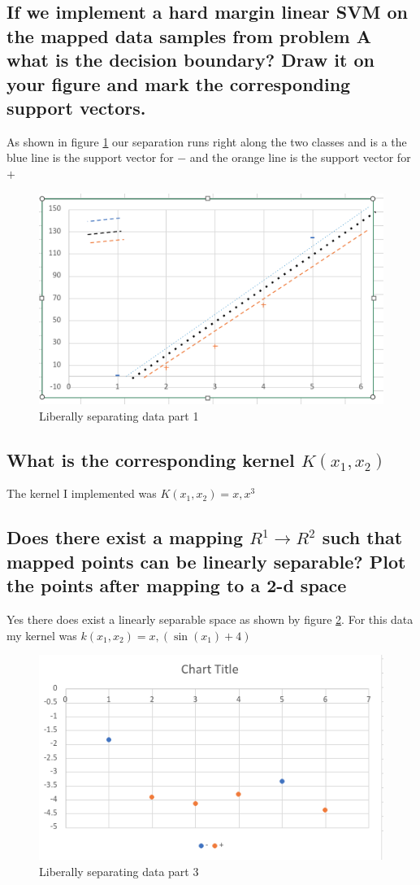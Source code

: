 \documentclass[11pt]{article}
\begin{document}
\subsection{If we implement a hard margin linear SVM on the mapped data samples from problem A what is the decision boundary? Draw it on your figure and mark the corresponding support vectors.}
As shown in figure \ref{fig:svm2} our separation runs right along the two classes and is a the blue line is the support vector for $-$ and the orange line is the support vector for $+$
\begin{figure}[]
\centering
\includegraphics[width=12cm]{Assignments/MidTerm/svmpart2.png}
\caption{Liberally separating data part 1}
\label{fig:svm2}
\end{figure}
\subsection{What is the corresponding kernel $K(x_1, x_2)$}
The kernel I implemented was $K(x_1, x_2) = x, x^3$
\subsection{Does there exist a mapping $R^1 \rightarrow R^2$ such that mapped points can be linearly separable? Plot the points after mapping to a 2-d space}
Yes there does exist a linearly separable space as shown by figure \ref{fig:svm3}. For this data my kernel was $k(x_1, x_2) = x, (\sin(x_1)+4)$
\begin{figure}[]
\centering
\includegraphics[width=12cm]{Assignments/MidTerm/svmpart3.png}
\caption{Liberally separating data part 3}
\label{fig:svm3}
\end{figure}
\end{document}
